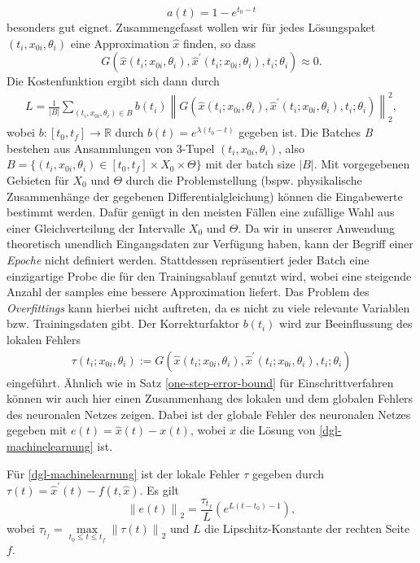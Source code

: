 \[
    a(t) = 1 - e^{t_0-t}
\]
besonders gut eignet. Zusammengefasst wollen wir für jedes Lösungspaket $(t_i,x_{0i}, \theta_i)$ eine Approximation
$\hat{x}$ finden, so dass
\[
    G(\hat{x}(t_i;x_{0i},\theta_i), \hat{x}^{\prime}(t_i;x_{0i},\theta_i),t_i;\theta_i) \approx 0.
\]
Die Kostenfunktion ergibt sich dann durch
\begin{align}
    \label{cost-func}
    L = \frac{1}{|B|} \sum_{(t_i,x_{0i},\theta_i) \in B} b(t_i)
    \left\lVert G(\hat{x}(t_i;x_{0i},\theta_i), \hat{x}^{\prime}(t_i;x_{0i},\theta_i),t_i;\theta_i) \right\rVert_2^2,
\end{align}
wobei $b:[t_0,t_f] \rightarrow \mathbb{R}$ durch $b(t) = e^{\lambda (t_0 - t)}$ gegeben ist. Die Batches \textit{B}
bestehen aus Ansammlungen von 3-Tupel $(t_i,x_{0i},\theta_i)$, also
$B=\{(t_i,x_{0i},\theta_i) \in [t_0,t_f] \times X_0 \times \Theta\}$ mit der batch size $|B|$. Mit vorgegebenen Gebieten
für $X_0$ und $\Theta$ durch die Problemstellung (bspw. physikalische Zusammenhänge der gegebenen Differentialgleichung)
können die Eingabewerte bestimmt werden. Dafür genügt in den meisten Fällen eine zufällige Wahl aus einer
Gleichverteilung der Intervalle $X_0$ und $\Theta$. Da wir in unserer Anwendung theoretisch unendlich Eingangsdaten zur
Verfügung haben, kann der Begriff einer \textit{Epoche} nicht definiert werden. Stattdessen repräsentiert jeder Batch
eine einzigartige Probe die für den Trainingsablauf genutzt wird, wobei eine steigende Anzahl der samples eine bessere
Approximation liefert. Das Problem des \textit{Overfittings} kann hierbei nicht auftreten, da es nicht zu viele
relevante Variablen bzw. Trainingsdaten gibt. Der Korrekturfaktor $b(t_i)$ wird zur Beeinflussung des lokalen Fehlers
\begin{align*}
    \tau(t_i;x_{0i}, \theta_i)
    := G \left( \hat{x}(t_i;x_{0i}, \theta_i), \hat{x}^{\prime}(t_i;x_{0i}, \theta_i),t_i;\theta_i \right)
\end{align*}
eingeführt. Ähnlich wie in Satz \eqref{one-step-error-bound} für Einschrittverfahren können wir auch hier einen
Zusammenhang des lokalen und dem globalen Fehlers des neuronalen Netzes zeigen. Dabei ist der globale Fehler des
neuronalen Netzes gegeben mit $e(t) = \hat{x}(t) - x(t)$, wobei $x$ die Lösung von \eqref{dgl-machinelearnung} ist.
\begin{satz}
    Für \eqref{dgl-machinelearnung} ist der lokale Fehler $\tau$ gegeben durch
    $\tau(t) = \hat{x}^{\prime}(t) - f(t,\hat{x})$. Es gilt
    \[
        \left\lVert e(t) \right\rVert_2 = \frac{\tau_{t_f}}{L} \left( e^{L(t-t_0) - 1} \right),
    \]
    wobei $\tau_{t_f} = \max\limits_{t_0 \leq t \leq t_f} \left\lVert \tau(t) \right\rVert_2$ und $L$ die
    Lipschitz-Konstante der rechten Seite $f$.
\end{satz}
